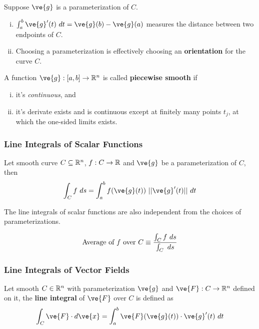 \documentclass[11pt]{article}
\begin{document}
			\begin{remark}[Interpretations]Suppose $\ve{g}$ is a parameterization of $C$.
				\begin{enumerate}[(i)]
					\item $\int_a^b \ve{g}'(t)\ dt = \ve{g}(b) - \ve{g}(a)$ measures the distance between two endpoints of $C$. 
					\item Choosing a parameterization is effectively choosing an \textbf{orientation} for the curve $C$.
				\end{enumerate}
			\end{remark}
			
			\begin{definition}
				A function $\ve{g}: [a, b] \to \R^n$ is called \textbf{piecewise smooth} if 
				\begin{enumerate}[(i)]
					\item it's \emph{continuous}, and 
					\item it's derivate exists and is continuous except at finitely many points $t_j$, at which the one-sided limits exists.
				\end{enumerate}
			\end{definition}
		
		\subsubsection{Line Integrals of Scalar Functions}
			\begin{definition} Let smooth curve $C \subseteq \mathbb{R}^n$, $f: C \to \mathbb{R}$ and $\ve{g}$ be a parameterization of $C$, then 
				\begin{equation}
					\int_C f\ ds = \int_a^b f(\ve{g}(t))\ ||\ve{g}'(t)||\ dt
				\end{equation}
			\end{definition}
			
			\begin{remark}
				The line integrals of scalar functions are also independent from the choices of parameterizations.
			\end{remark}
			
			\begin{definition}
				\begin{equation}
					\text{{Average of $f$ over $C$}} \equiv \frac{\int_C f\ ds}{\int_C\ ds}
				\end{equation}
			\end{definition}
			
		\subsubsection{Line Integrals of Vector Fields}
			\begin{definition} Let smooth $C \in \mathbb{R}^n$ with parameterization $\ve{g}$ and $\ve{F}: C \to \R^n$ defined on it, the \textbf{line integral} of $\ve{F}$ over $C$ is defined as 
				\begin{equation}
					\int_C \ve{F}\cdot d\ve{x} = \int_a^b \ve{F}(\ve{g}(t)) \cdot \ve{g}'(t)\ dt
				\end{equation}
			\end{definition}
			
\end{document}
